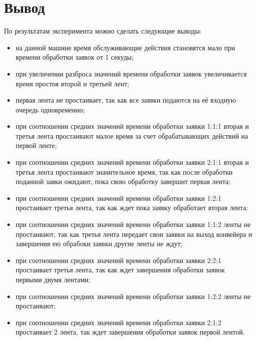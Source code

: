 \section{Вывод}

По результатам эксперимента можно сделать следующие выводы:
\begin{itemize}[left=\parindent]
    \item на данной машине время обслуживающие действия становятся мало при
        времени обработки заявок от 1 секуды;
    \item при увеличении разброса значений времени обработки заявок
        увеличивается время простоя второй и третьей лент;
    \item первая лента не простаивает, так как все заявки подаются на её
        входную очередь одновременно;
    \item при соотношении средних значений времени обработки заявки 1:1:1
        вторая и третья лента простаивают малое время за счет обрабатывающих
        действий на первой ленте;
    \item при соотношении средних значений времени обработки заявки 2:1:1
        вторая и третья лента простаивают значительное время, так как
        после обработки поданной заяки ожидают, пока свою обработку
        завершит первая лента;
    \item при соотношении средних значений времени обработки заявки 1:2:1
        простаивает третья лента, так как ждет пока заявку обработает вторая
        лента;
    \item при соотношении средних значений времени обработки заявки 1:1:2 ленты
        не простаивают, так как третья лента передает свои заявки на выход
        конвейера и завершения ею обрабоки заявки другие ленты не ждут;
    \item при соотношении средних значений времени обработки заявки 2:2:1
        простаивает третья лента, так как ждет завершения обработки заявок
        первыми двумя лентами;
    \item при соотношении средних значений времени обработки заявки 1:2:2
        ленты не простаивают;
    \item при соотношении средних значений времени обработки заявки 2:1:2
        простаивает 2 лента, так ждет завершения обработки заявок первой
        лентой.
\end{itemize}

